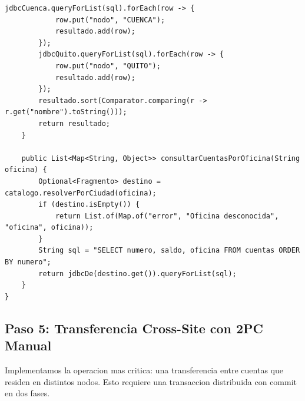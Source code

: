 \documentclass[11pt,a4paper]{article}
\begin{document}
\begin{lstlisting}[style=JavaStyle,caption={ConsultaDistribuidaService.java: consulta y union de resultados}]
        jdbcCuenca.queryForList(sql).forEach(row -> {
            row.put("nodo", "CUENCA");
            resultado.add(row);
        });
        jdbcQuito.queryForList(sql).forEach(row -> {
            row.put("nodo", "QUITO");
            resultado.add(row);
        });
        resultado.sort(Comparator.comparing(r -> r.get("nombre").toString()));
        return resultado;
    }

    public List<Map<String, Object>> consultarCuentasPorOficina(String oficina) {
        Optional<Fragmento> destino = catalogo.resolverPorCiudad(oficina);
        if (destino.isEmpty()) {
            return List.of(Map.of("error", "Oficina desconocida", "oficina", oficina));
        }
        String sql = "SELECT numero, saldo, oficina FROM cuentas ORDER BY numero";
        return jdbcDe(destino.get()).queryForList(sql);
    }
}
\end{lstlisting}

\subsection{Paso 5: Transferencia Cross-Site con 2PC Manual}

Implementamos la operacion mas critica: una transferencia entre cuentas que residen en distintos nodos. Esto requiere una transaccion distribuida con commit en dos fases.
\end{document}
